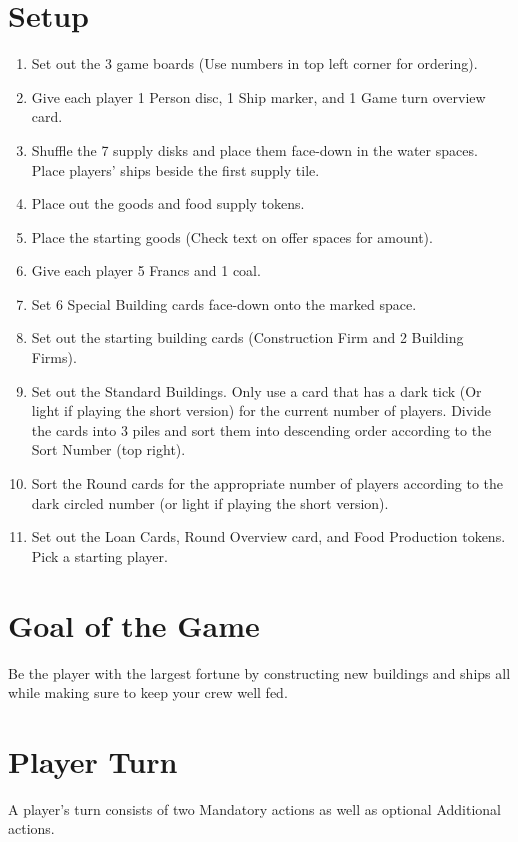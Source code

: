 \documentclass[12pt]{article}
\newenvironment{enumerateCustom}
{\begin{enumerate}
  \setlength{\itemsep}{1pt}
  \setlength{\parskip}{0pt}
  \setlength{\parsep}{0pt}}
{\end{enumerate}}
\begin{document}
\begin{multicols*}{2}

\section*{Setup}
\begin{enumerateCustom}
	\item Set out the 3 game boards (Use numbers in top left corner for ordering).
	\item Give each player 1 Person disc, 1 Ship marker, and 1 Game turn overview card.
	\item Shuffle the 7 supply disks and place them face-down in the water spaces. Place players' ships beside the first supply tile.
	\item Place out the goods and food supply tokens.
	\item Place the starting goods (Check text on offer spaces for amount).
	\item Give each player 5 Francs and 1 coal.
	\item Set 6 Special Building cards face-down onto the marked space.
	\item Set out the starting building cards (Construction Firm and 2 Building Firms).
	\item Set out the Standard Buildings. Only use a card that has a dark tick (Or light if playing the short version) for the current number of players. Divide the cards into 3 piles and sort them into descending order according to the Sort Number (top right).
	\item Sort the Round cards for the appropriate number of players according to the dark circled number (or light if playing the short version).
	\item Set out the Loan Cards, Round Overview card, and Food Production tokens. Pick a starting player.
\end{enumerateCustom}

\section*{Goal of the Game}
Be the player with the largest fortune by constructing new buildings and ships all while making sure to keep your crew well fed. 

\section*{Player Turn}
A player's turn consists of two Mandatory actions as well as optional Additional actions. 


\end{multicols*}
\end{document}
